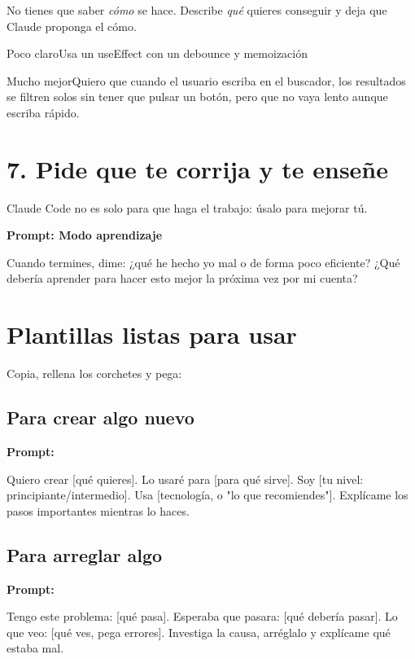 \documentclass[11pt,a4paper]{report}
\begin{document}
No tienes que saber \emph{cómo} se hace. Describe \emph{qué} quieres conseguir y deja que Claude proponga el cómo.

 Poco claroUsa un useEffect con un debounce y memoización

 Mucho mejorQuiero que cuando el usuario escriba en el buscador, los resultados se filtren solos sin tener que pulsar un botón, pero que no vaya lento aunque escriba rápido.

\section{7. Pide que te corrija y te enseñe}

Claude Code no es solo para que haga el trabajo: úsalo para mejorar tú.

\noindent\textbf{Prompt: Modo aprendizaje}
\begin{codebox}
Cuando termines, dime: ¿qué he hecho yo mal o de forma poco eficiente? ¿Qué debería aprender para hacer esto mejor la próxima vez por mi cuenta?
\end{codebox}

\section{Plantillas listas para usar}

Copia, rellena los corchetes y pega:

\subsection{ Para crear algo nuevo}

\noindent\textbf{Prompt: }
\begin{codebox}
Quiero crear [qué quieres]. Lo usaré para [para qué sirve]. Soy [tu nivel: principiante/intermedio]. Usa [tecnología, o "lo que recomiendes"]. Explícame los pasos importantes mientras lo haces.
\end{codebox}

\subsection{ Para arreglar algo}

\noindent\textbf{Prompt: }
\begin{codebox}
Tengo este problema: [qué pasa]. Esperaba que pasara: [qué debería pasar]. Lo que veo: [qué ves, pega errores]. Investiga la causa, arréglalo y explícame qué estaba mal.
\end{codebox}
\end{document}
